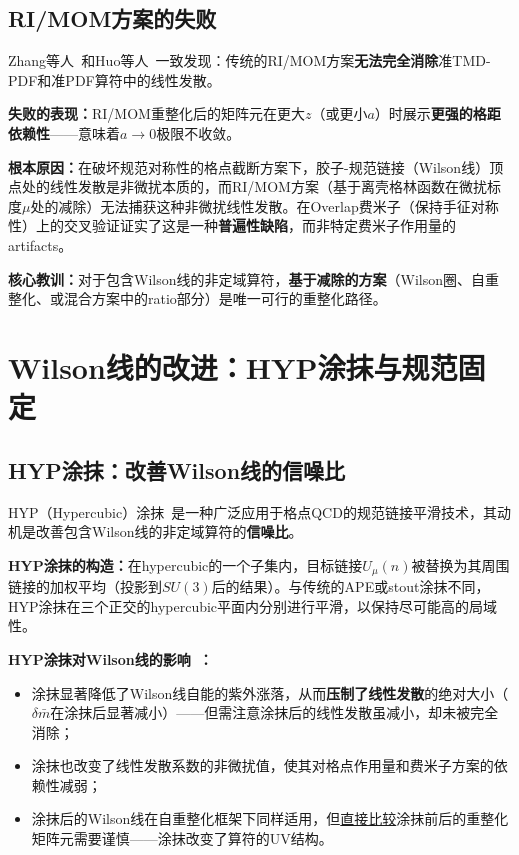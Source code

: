 \documentclass[12pt,a4paper]{ctexart}
\theoremstyle{definition}
\begin{document}
\subsection{RI/MOM方案的失败}

Zhang等人~\cite{Zhang2022renormTMD}和Huo等人~\cite{Huo2021self}一致发现：传统的RI/MOM方案\textbf{无法完全消除}准TMD-PDF和准PDF算符中的线性发散。

\textbf{失败的表现：}RI/MOM重整化后的矩阵元在更大$z$（或更小$a$）时展示\textbf{更强的格距依赖性}——意味着$a\to 0$极限不收敛。

\textbf{根本原因：}在破坏规范对称性的格点截断方案下，胶子-规范链接（Wilson线）顶点处的线性发散是非微扰本质的，而RI/MOM方案（基于离壳格林函数在微扰标度$\mu$处的减除）无法捕获这种非微扰线性发散。在Overlap费米子（保持手征对称性）上的交叉验证证实了这是一种\textbf{普遍性缺陷}，而非特定费米子作用量的artifacts。

\textbf{核心教训：}对于包含Wilson线的非定域算符，\textbf{基于减除的方案}（Wilson圈、自重整化、或混合方案中的ratio部分）是唯一可行的重整化路径。

\section{Wilson线的改进：HYP涂抹与规范固定}

\subsection{HYP涂抹：改善Wilson线的信噪比}

HYP（Hypercubic）涂抹~\cite{HYPsmearing}是一种广泛应用于格点QCD的规范链接平滑技术，其动机是改善包含Wilson线的非定域算符的\textbf{信噪比}。

\textbf{HYP涂抹的构造：}在hypercubic的一个子集内，目标链接$U_\mu(n)$被替换为其周围链接的加权平均（投影到$SU(3)$后的结果）。与传统的APE或stout涂抹不同，HYP涂抹在三个正交的hypercubic平面内分别进行平滑，以保持尽可能高的局域性。

\textbf{HYP涂抹对Wilson线的影响~\cite{Huo2021self}：}
\begin{itemize}
    \item 涂抹显著降低了Wilson线自能的紫外涨落，从而\textbf{压制了线性发散}的绝对大小（$\delta\bar{m}$在涂抹后显著减小）——但需注意涂抹后的线性发散虽减小，却未被完全消除；
    \item 涂抹也改变了线性发散系数的非微扰值，使其对格点作用量和费米子方案的依赖性减弱；
    \item 涂抹后的Wilson线在自重整化框架下同样适用，但\underline{直接比较}涂抹前后的重整化矩阵元需要谨慎——涂抹改变了算符的UV结构。
\end{itemize}
\end{document}
